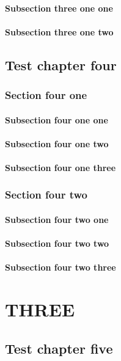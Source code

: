 \documentclass{book}
\begin{document}
\subsection{Subsection three one one}
\subsection{Subsection three one two}

\chapter{Test chapter four}
\localtableofcontents

\section{Section four one}
\subsection{Subsection four one one}
\subsection{Subsection four one two}
\subsection{Subsection four one three}
\section{Section four two}
\subsection{Subsection four two one}
\subsection{Subsection four two two}
\subsection{Subsection four two three}

\part{THREE}

\chapter{Test chapter five}
\localtableofcontents
\end{document}
